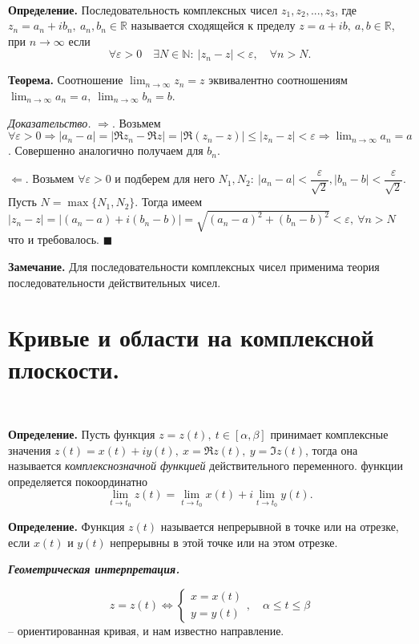 \documentclass[9pt]{article}
\begin{document}
\ 
\par\textbf{Определение.} Последовательность комплексных чисел \(z_1,z_2,...,z_3\), где \(z_n=a_n+ib_n,\ a_n,b_n\in\mathbb R\) называется сходящейся к пределу \(z=a+ib,\ a,b\in\mathbb R\), при \(n\to\infty\) если
\[\forall \varepsilon>0\quad \exists N\in \mathbb N:\ |z_n-z|<\varepsilon,\quad\forall n>N.\]
\par\textbf{Теорема.} Соотношение \(\displaystyle\lim_{n\to\infty}z_n=z\) эквивалентно соотношениям \(\displaystyle\lim_{n\to\infty}a_n=a,\ \displaystyle\lim_{n\to\infty}b_n=b\).
\par\textit{Доказательство.} \(\Rightarrow\). Возьмем \(\forall \varepsilon>0 \Rightarrow|a_n-a|=|\Re z_n-\Re z|=|\Re(z_n-z)|\le|z_n-z|<\varepsilon \Rightarrow \displaystyle\lim_{n\to\infty}a_n=a\). Совершенно аналогично получаем для \(b_n\).
\par\(\Leftarrow\). Возьмем \(\forall \varepsilon > 0\) и подберем для него \(N_1, N_2:\ |a_n-a|<\dfrac{\varepsilon}{\sqrt2}, |b_n-b|<\dfrac{\varepsilon}{\sqrt2}\). Пусть \(N=\max\{N_1, N_2\}\). Тогда имеем \(|z_n-z|=|(a_n-a)+i(b_n-b)|=\sqrt{(a_n-a)^2+(b_n-b)^2}<\varepsilon,\ \forall n>N\) что и требовалось. \(\blacksquare\)
\par\textbf{Замечание.} Для последовательности комплексных чисел применима теория последовательности действительных чисел.

\section{Кривые и области на комплексной плоскости.}

\ 
\par\textbf{Определение.} Пусть функция \(z=z(t),\ t\in[\alpha,\beta]\) принимает комплексные значения \(z(t)=x(t)+iy(t),\ x=\Re z(t),\ y=\Im z(t)\), тогда она называется \textit{комплекснозначной функцией} действительного переменного.
 функции определяется покоординатно \[\displaystyle\lim_{t\to t_0}z(t)=\lim_{t\to t_0}x(t)+i\lim_{t\to t_0}y(t).\]
\par\textbf{Определение.} Функция \(z(t)\) называется непрерывной в точке или на отрезке, если \(x(t)\) и \(y(t)\) непрерывны в этой точке или на этом отрезке.

\textbf{\textit{Геометрическая интерпретация.}}

\[z=z(t)\Leftrightarrow\left\{
\begin{array}{l}
    x=x(t) \\
    y=y(t)
\end{array}\right.,\quad \alpha\le t\le\beta\] -- ориентированная кривая, и нам известно направление.
\end{document}
